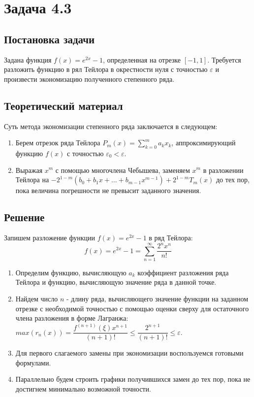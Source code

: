 \section*{Задача 4.3}
\subsection*{Постановка задачи}
Задана функция $f(x) = e^{2x} - 1$, определенная на отрезке $[-1, 1]$. Требуется разложить функцию в рял Тейлора в окрестности нуля с точностью $\varepsilon$ и произвести экономизацию полученного степенного ряда.

\subsection*{Теоретический материал}
Суть метода экономизации степенного ряда заключается в следующем:

\begin{enumerate}
	\item Берем отрезок ряда Тейлора $P_m(x) = \sum\limits_{k = 0}^m a_kx_k$, аппроксимирующий функцию $f(x)$ с точностью $\varepsilon_0 < \varepsilon$.
	\item Выражая $x^m$ с помощью многочлена Чебышева, заменяем $x^m$ в разложении Тейлора на $-2^{1 - m}(b_0 + b_1x + \dots + b_{m - 1} x^{m-1}) + 2^{1 - m}T_m(x)$ до тех пор, пока величина погрешности не превысит заданного значения.
\end{enumerate}

\subsection*{Решение}
Запишем разложение функции $f(x) = e^{2x} - 1$ в ряд Тейлора:
\[
	f(x) = e^{2x} - 1 = \sum\limits_{n = 1}^\infty \dfrac{2^nx^n}{n!}
\]

\begin{enumerate}
	\item Определим функцию, вычисляющую $a_k$ коэффициент разложения ряда Тейлора и функцию, вычисляющую значение ряда в данной точке.
	\item Найдем число $n$ - длину ряда, вычисляющего значение функции на заданном отрезке с необходимой точностью с помощью оценки сверху для остаточного члена разложения в форме Лагранжа: $max(r_n(x)) = \dfrac{f^{(n+1)}(\xi)x^{n+1}}{(n+1)!} \leq \dfrac{2^{n+1}}{(n+1)!} \leq \varepsilon$.
	\item Для первого слагаемого замены при экономизации воспользуемся готовыми формулами.
	\item Параллельно будем строить графики получившихся замен до тех пор, пока не достигнем минимально возможной точности.
\end{enumerate}

